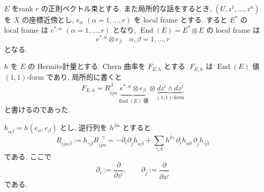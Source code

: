 \documentclass[dvipdfmx,a4paper,11pt]{article} %
\theoremstyle{definition}
\theoremstyle{remark}
\numberwithin{equation}{section}
\newcommand{\End}[0]{\operatorname{End}}
\begin{document}
 \(E\) をrank \(r\) の正則ベクトル束とする. また局所的な話をするとき, \((U,z^1,\ldots,z^n)\) を \(X\) の座標近傍とし, \(e_\alpha\) \((\alpha=1,\ldots,r)\) を local frame とする. 
すると \(E^*\) の local frame は \(e^{*,\alpha}\) \((\alpha=1,\ldots,r)\) となり, \(\End(E)=E^*\otimes E\) の local frame は
$$
e^{*,\alpha}\otimes e_\beta
\quad \alpha,\beta=1,\ldots,r
$$
となる.

\(h\) を \(E\) の Hermite計量とする. Chern 曲率を \(F_{E,h}\) とする. \(F_{E,h}\) は \(\End(E)\) 値 \((1,1)\)-form であり, 局所的に書くと
$$
F_{E,h}=
R_{i\overline{j}\alpha}^{\beta} 
\underbrace{e^{*,\alpha}\otimes e_\beta}_{\text{\(\End(E)\) 値}} \otimes \underbrace{dz^i\wedge d \overline{z^j}}_{\text{$(1,1)$-form}}
$$
と書けるのであった.

\(h_{\alpha\overline{\beta}}=h(e_\alpha,e_\beta)\) とし, 逆行列を \(h^{\overline{\beta}\alpha}\) とすると
\[
R_{i\overline{j}\alpha\overline{\beta}}
:=h_{\gamma\overline{\beta}}R_{i\overline{j}\alpha}^{\ \ \ \gamma}
=
-\partial_i\partial_{\overline{j}}h_{\alpha\overline{\beta}}
+
\sum_{\gamma,\delta}h^{\overline{\delta}\gamma}\,\partial_i h_{\alpha\overline{\delta}}\,\partial_{\overline{j}}h_{\gamma\overline{\beta}}
\]
である. ここで
\[
\partial_i:=\frac{\partial}{\partial z^i},\qquad
\partial_{\overline{j}}:=\frac{\partial}{\partial \overline{z^j}}
\]
である.
\end{document}
